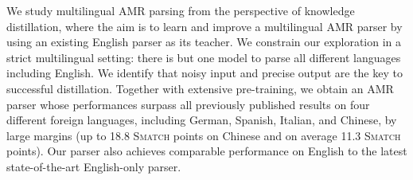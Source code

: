 We study multilingual AMR parsing from the perspective of knowledge distillation, where the aim is to learn and improve a multilingual AMR parser by using an existing English parser as its teacher. We constrain our exploration in a strict multilingual setting: there is but one model to parse all different languages including English. We identify that noisy input and precise output are the key to successful distillation. Together with extensive pre-training, we obtain an AMR parser whose performances surpass all previously published results on four different foreign languages, including German, Spanish, Italian, and Chinese, by large margins (up to 18.8 \textsc{Smatch} points on Chinese and on average 11.3 \textsc{Smatch} points). Our parser also achieves comparable performance on English to the latest state-of-the-art English-only parser.
